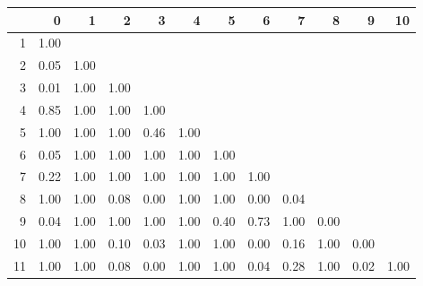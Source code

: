 \begin{tabular}{rrrrrrrrrrrr}
  \hline
 & 0 & 1 & 2 & 3 & 4 & 5 & 6 & 7 & 8 & 9 & 10 \\ 
  \hline
1 & 1.00 &  &  &  &  &  &  &  &  &  &  \\ 
  2 & 0.05 & 1.00 &  &  &  &  &  &  &  &  &  \\ 
  3 & 0.01 & 1.00 & 1.00 &  &  &  &  &  &  &  &  \\ 
  4 & 0.85 & 1.00 & 1.00 & 1.00 &  &  &  &  &  &  &  \\ 
  5 & 1.00 & 1.00 & 1.00 & 0.46 & 1.00 &  &  &  &  &  &  \\ 
  6 & 0.05 & 1.00 & 1.00 & 1.00 & 1.00 & 1.00 &  &  &  &  &  \\ 
  7 & 0.22 & 1.00 & 1.00 & 1.00 & 1.00 & 1.00 & 1.00 &  &  &  &  \\ 
  8 & 1.00 & 1.00 & 0.08 & 0.00 & 1.00 & 1.00 & 0.00 & 0.04 &  &  &  \\ 
  9 & 0.04 & 1.00 & 1.00 & 1.00 & 1.00 & 0.40 & 0.73 & 1.00 & 0.00 &  &  \\ 
  10 & 1.00 & 1.00 & 0.10 & 0.03 & 1.00 & 1.00 & 0.00 & 0.16 & 1.00 & 0.00 &  \\ 
  11 & 1.00 & 1.00 & 0.08 & 0.00 & 1.00 & 1.00 & 0.04 & 0.28 & 1.00 & 0.02 & 1.00 \\ 
   \hline
\end{tabular}


